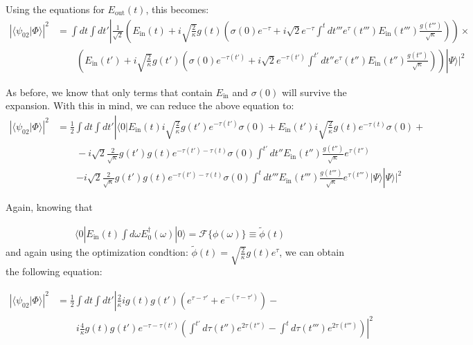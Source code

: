 \documentclass[12pt]{article}
\begin{document}
Using the equations for $E_\textrm{out}(t)$, this becomes:
\begin{align}
\left | \langle \psi_{02} | \Phi \rangle \right | ^2 & =\int dt \int dt'\left |  \frac{1}{\sqrt{2}}\left ( E_\textrm{in}(t) 
+ i \sqrt{\frac{2}{\kappa}} g(t)\left ( \sigma(0) e^{-\tau} +
i\sqrt{2} e^{-\tau} \int^t d t''' e^\tau(t''') E_\textrm{in}(t''') \frac{g(t''')}{\sqrt{\kappa}} \right ) \right) \right .\times \\
 &\qquad \left. \left (E_\textrm{in}(t') + i \sqrt{\frac{2}{\kappa}} g(t')\left( \sigma(0) e^{-\tau(t')} +
 i\sqrt{2} e^{-\tau(t')} \int^{t'} d t'' e^\tau(t'') E_\textrm{in}(t'') \frac{g(t'')}{\sqrt{\kappa}}\right ) \right ) \right | \Psi \rangle |^2
\end{align}

 
 As before, we know that only terms that contain $E_\textrm{in}$ and $\sigma(0)$ will survive the expansion. With this in 
 mind, we can reduce the above equation to:
\begin{align}
 \left | \langle \psi_{02} | \Phi \rangle \right | ^2 & = \frac{1}{2}\int dt \int dt'\left |\langle 0 | E_\textrm{in}(t) i \sqrt{\frac{2}{\kappa}} g(t') e^{-\tau(t')}\sigma(0) + E_\textrm{in}(t') i \sqrt{\frac{2}{\kappa}} g(t) e^{-\tau(t)}\sigma(0) +\right.\\
&\qquad -i\sqrt{2}\frac{2}{\sqrt{\kappa}}g(t')g(t) e^{-\tau(t')-\tau(t)}\sigma(0) \int ^{t'} dt'' E_\textrm{in}(t'')\frac{g(t'')}{\sqrt{\kappa}} e^{\tau(t'')}\\
&\qquad \left. -i\sqrt{2}\frac{2}{\sqrt{\kappa}}g(t')g(t) e^{-\tau(t')-\tau(t)}\sigma(0) \int ^t dt''' E_\textrm{in}(t''')\frac{g(t''')}{\sqrt{\kappa}} e^{\tau(t''')}| \Psi \rangle\right| \Psi \rangle |^2
 \end{align}
 
Again, knowing that


\begin{align}
\langle 0 |E_\textrm{in}(t) \int d\omega E^\dagger_0(\omega) | 0 \rangle= \mathscr{F}\{\phi(\omega)\} \equiv \tilde{\phi}(t)
\end{align}
and again using the optimization condtion: $\tilde{\phi}(t) = \sqrt{\frac{2}{\kappa}} g(t) e^{\tau}$, we can obtain the following equation:

\begin{align}
\left | \langle \psi_{02} | \Phi \rangle \right | ^2 & = \frac{1}{2}\int dt \int dt'\left | \frac{2}{\kappa} i g(t) g(t') \left(e^{\tau-\tau'} +e^{-(\tau-\tau')}\right) -\right.\\
&\qquad \left.i \frac{4}{\kappa}g(t) g(t') e^{-\tau-\tau(t')}\left( \int^{t'} d \tau(t'') e^{2\tau(t'')} - \int^t d \tau(t''') e^{2\tau(t''')} \right) \right |^2
\end{align}
\end{document}
